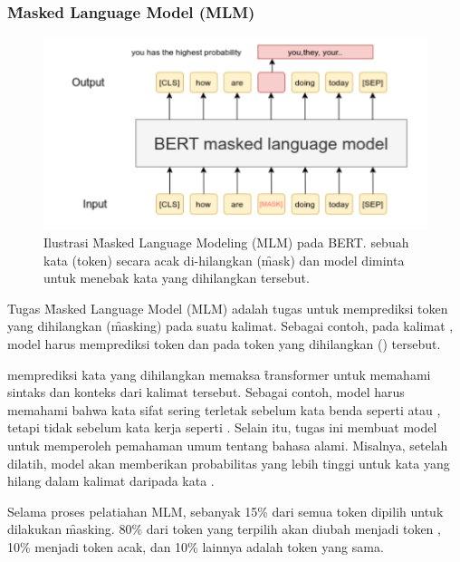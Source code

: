 	\subsubsection{\f{Masked Language Model} (MLM)}
	\label{sec:masked-language-model}

	\begin{figure}
		\centering
		\includegraphics[width=1\textwidth]{assets/pics/MLM.png}
		\caption{Ilustrasi \f{Masked Language Modeling} (MLM) pada BERT. sebuah kata (token) secara acak di-hilangkan (\f{mask}) dan model diminta untuk menebak kata yang dihilangkan tersebut.}
		\label{fig:masked-language-model}
	\end{figure}

	Tugas \f{Masked Language Model} (MLM) adalah tugas untuk memprediksi token yang dihilangkan (\f{masking}) pada suatu kalimat. Sebagai contoh, pada kalimat , model harus memprediksi token  dan  pada token yang dihilangkan (\code{[MASK]}) tersebut.


	memprediksi kata yang dihilangkan memaksa \f{transformer} untuk memahami sintaks dan konteks dari kalimat tersebut. Sebagai contoh, model harus memahami bahwa kata sifat  sering terletak sebelum kata benda seperti  atau , tetapi tidak sebelum kata kerja seperti . Selain itu, tugas ini membuat model untuk memperoleh pemahaman umum tentang bahasa alami. Misalnya, setelah dilatih, model akan memberikan probabilitas yang lebih tinggi untuk kata  yang hilang dalam kalimat  daripada kata .

	Selama proses pelatiahan MLM, sebanyak 15\% dari semua token dipilih untuk dilakukan \f{masking}. 80\% dari token yang terpilih akan diubah menjadi token \code{[MASK]}, 10\% menjadi token acak, dan 10\% lainnya adalah token yang sama.


